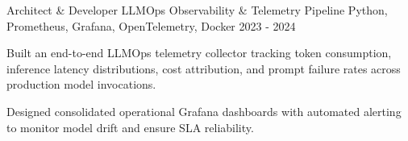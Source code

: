 \begin{cventries}
  \cventry
    {Architect \& Developer} %
    {LLMOps Observability \& Telemetry Pipeline} %
    {Python, Prometheus, Grafana, OpenTelemetry, Docker} %
    {2023 - 2024} %
    {
      \begin{cvitems} %
        \item {Built an end-to-end LLMOps telemetry collector tracking token consumption, inference latency distributions, cost attribution, and prompt failure rates across production model invocations.}
        \item {Designed consolidated operational Grafana dashboards with automated alerting to monitor model drift and ensure SLA reliability.}
      \end{cvitems}
    }

\end{cventries}
